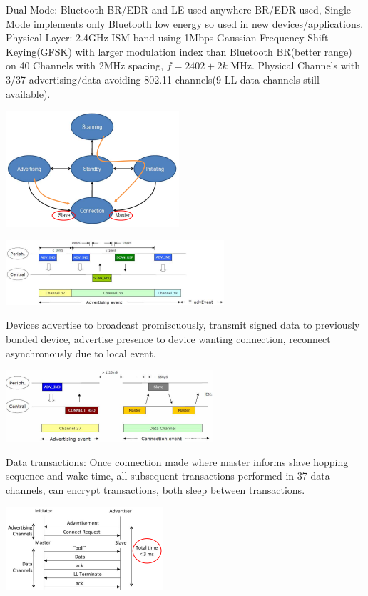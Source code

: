 \documentclass[9pt]{extarticle}
\begin{document}
\begin{multicols}{2}
Dual Mode: Bluetooth BR/EDR and LE used anywhere BR/EDR used, Single Mode implements only Bluetooth low energy so used in
new devices/applications. Physical Layer: 2.4GHz ISM band using 1Mbps Gaussian Frequency Shift Keying(GFSK) with larger modulation index than Bluetooth BR(better range) on 40 Channels with 2MHz spacing, $f=2402+2k$ MHz. Physical Channels with 3/37 advertising/data avoiding 802.11 channels(9 LL data channels still available).

\includegraphics{llstatemachine.png}

\includegraphics{advertising.png}

Devices advertise to broadcast promiscuously, transmit signed data to previously bonded device, advertise presence to device wanting connection, reconnect asynchronously due to local event.

\includegraphics{datatransaction.png}

Data transactions: Once connection made where master informs slave hopping sequence and wake time, all subsequent transactions performed in 37 data channels, can encrypt transactions, both sleep between transactions. 

\includegraphics{latency.png}


\end{multicols}
\end{document}
